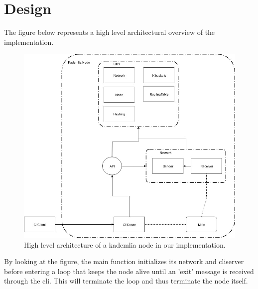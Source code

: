 \section{Design}\label{sec:design}
The figure below represents a high level architectural overview of the
implementation.

\begin{figure}[ht]
\centering
\includegraphics[width=\linewidth]{D7024E-architecture.jpg}
\caption{High level architecture of a kademlia node in our implementation.}
\end{figure}

By looking at the figure, the main function
initializes its network and cliserver before entering a loop that keeps the
node alive until an 'exit' message is received through the cli. This will
terminate the loop and thus terminate the node itself.

